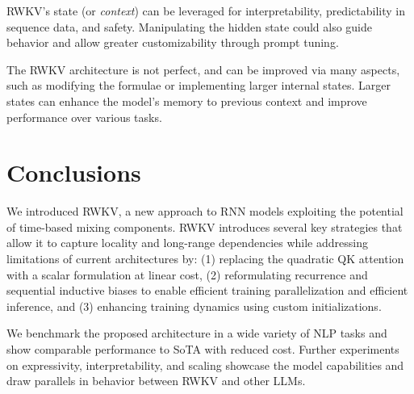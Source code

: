 \documentclass[11pt]{article}
\begin{document}
RWKV's state (or \textit{context}) can be leveraged for interpretability, predictability in sequence data, and safety. Manipulating the hidden state could also guide behavior and allow greater customizability through prompt tuning.

The RWKV architecture is not perfect, and can be improved via many aspects, such as modifying the formulae or implementing larger internal states. Larger states can enhance the model's memory to previous context and improve performance over various tasks.




\section{Conclusions} \label{conclusions}
We introduced RWKV, a new approach to RNN models exploiting the potential of time-based mixing components. RWKV introduces several key strategies that allow it to capture locality and long-range dependencies while addressing limitations of current architectures by: (1) replacing the quadratic QK attention with a scalar formulation at linear cost, (2) reformulating recurrence and sequential inductive biases to enable efficient training parallelization and efficient inference, and (3) enhancing training dynamics using custom initializations. 

We benchmark the proposed architecture in a wide variety of NLP tasks and show comparable performance to SoTA with reduced cost. Further experiments on expressivity, interpretability, and scaling showcase the model capabilities and draw parallels in behavior between RWKV and other LLMs. 
\end{document}
